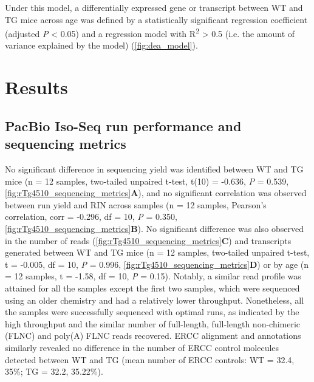 Under this model, a differentially expressed gene or transcript between WT and TG mice across age was defined by a statistically significant regression coefficient (adjusted \textit{P} < 0.05) and a regression model with R\textsuperscript{2} > 0.5 (i.e. the amount of variance explained by the model) (\cref{fig:dea_model}). 


\clearpage 
\section{Results}
\subsection{PacBio Iso-Seq run performance and sequencing metrics}
No significant difference in sequencing yield was identified between WT and TG mice (n = 12 samples, two-tailed unpaired t-test, t(10) = -0.636, \textit{P} = 0.539, \cref{fig:rTg4510_sequencing_metrics}\textbf{A}), and no significant correlation was observed between run yield and RIN across samples (n = 12 samples, Pearson's correlation, corr = -0.296, df = 10, \textit{P} = 0.350, \cref{fig:rTg4510_sequencing_metrics}\textbf{B}). No significant difference was also observed in the number of reads (\cref{fig:rTg4510_sequencing_metrics}\textbf{C}) and transcripts generated between WT and TG mice (n = 12 samples, two-tailed unpaired t-test, t = -0.005, df = 10, \textit{P} = 0.996, \cref{fig:rTg4510_sequencing_metrics}\textbf{D}) or by age (n = 12 samples, t = -1.58, df = 10, \textit{P} = 0.15). Notably, a similar read profile was attained for all the samples except the first two samples, which were sequenced using an older chemistry and had a relatively lower throughput. Nonetheless, all the samples were successfully sequenced with optimal runs, as indicated by the high throughput and the similar number of full-length, full-length non-chimeric (FLNC) and poly(A) FLNC reads recovered. ERCC alignment and annotations similarly revealed no difference in the number of ERCC control molecules detected between WT and TG (mean number of ERCC controls: WT = 32.4, 35\%; TG = 32.2, 35.22\%). 


